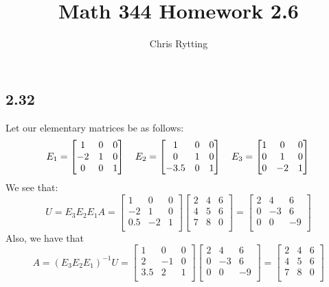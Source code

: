 \documentclass[letterpaper,12pt]{article}
\theoremstyle{definition}
\begin{document}
\title{Math 344 Homework 2.6}
\author{Chris Rytting}
\maketitle

\subsection*{2.32}
Let our elementary matrices be as follows:
\[
E_1 = 
\begin{bmatrix}
     1 & 0 & 0 \\
    -2 & 1 & 0 \\
     0 & 0 & 1 \\
\end{bmatrix} \quad
E_2 = 
\begin{bmatrix}
     1 & 0 & 0 \\
     0 & 1 & 0 \\
    -3.5 & 0 & 1 \\
\end{bmatrix} \quad
E_3 = 
\begin{bmatrix}
     1 & 0 & 0 \\
     0 & 1 & 0 \\
     0 & -2 & 1 \\
\end{bmatrix} \\
\]
We see that:
\[ U = E_3E_2E_1A =
\begin{bmatrix}
     1 & 0 & 0 \\
     -2 & 1 & 0 \\
     0.5 & -2 & 1 \\
\end{bmatrix}
\begin{bmatrix}
     2 & 4 & 6 \\
     4 & 5 & 6 \\
     7 & 8 & 0 \\
\end{bmatrix}
=
\begin{bmatrix}
     2 & 4 & 6 \\
     0 & -3 & 6 \\
     0 & 0 & -9 \\
\end{bmatrix}
\]
Also, we have that
\[
A=(E_3E_2E_1)^{-1}U = 
\begin{bmatrix}
     1 & 0 & 0 \\
     2 & -1 & 0 \\
     3.5 & 2 & 1 \\
\end{bmatrix}
\begin{bmatrix}
     2 & 4 & 6 \\
     0 & -3 & 6 \\
     0 & 0 & -9 \\
\end{bmatrix}
=
\begin{bmatrix}
     2 & 4 & 6 \\
     4 & 5 & 6 \\
     7 & 8 & 0 \\
\end{bmatrix}
\]
\end{document}
